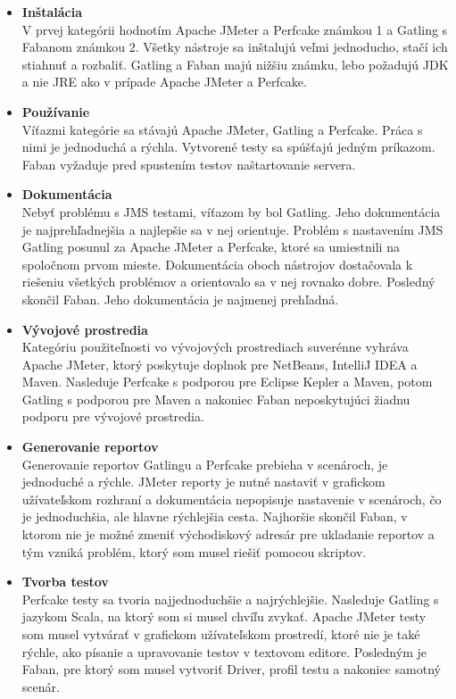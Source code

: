 \documentclass[12pt,oneside,final]{fithesis-utf8}
\begin{document}
\begin{itemize}

\item \textbf{Inštalácia}\\
V prvej kategórii hodnotím Apache JMeter a Perfcake známkou 1 a Gatling s Fabanom známkou 2. Všetky nástroje sa inštalujú veľmi jednoducho, stačí ich stiahnuť a rozbaliť. Gatling a Faban majú nižšiu známku, lebo požadujú JDK a nie JRE ako v prípade Apache JMeter a Perfcake.

\item \textbf{Používanie}\\
Víťazmi kategórie sa stávajú Apache JMeter, Gatling a Perfcake. Práca s nimi je jednoduchá a rýchla. Vytvorené testy sa spúšťajú jedným príkazom. Faban vyžaduje pred spustením testov naštartovanie servera.

\item \textbf{Dokumentácia}\\
Nebyť problému s JMS testami, víťazom by bol Gatling. Jeho dokumentácia je najprehľadnejšia a najlepšie sa v nej orientuje. Problém s nastavením JMS Gatling posunul za Apache JMeter a Perfcake, ktoré sa umiestnili na spoločnom prvom mieste. Dokumentácia oboch nástrojov dostačovala k riešeniu všetkých problémov a orientovalo sa v nej rovnako dobre. Posledný skončil Faban. Jeho dokumentácia je najmenej prehľadná. 

\item \textbf{Vývojové prostredia}\\
Kategóriu použiteľnosti vo vývojových prostrediach suverénne vyhráva Apache JMeter, ktorý poskytuje doplnok pre NetBeans, IntelliJ IDEA a Maven. Nasleduje Perfcake s podporou pre Eclipse Kepler a Maven, potom Gatling s podporou pre Maven a nakoniec Faban neposkytujúci žiadnu podporu pre vývojové prostredia.

\item \textbf{Generovanie reportov}\\
Generovanie reportov Gatlingu a Perfcake prebieha v scenároch, je jednoduché a rýchle. JMeter reporty je nutné nastaviť v grafickom užívateľskom rozhraní a dokumentácia nepopisuje nastavenie v scenároch, čo je jednoduchšia, ale hlavne rýchlejšia cesta. Najhoršie skončil Faban, v ktorom nie je možné zmeniť východiskový adresár pre ukladanie reportov a tým vzniká problém, ktorý som musel riešiť pomocou skriptov.

\item \textbf{Tvorba testov}\\
Perfcake testy sa tvoria najjednoduchšie a najrýchlejšie. Nasleduje Gatling s jazykom Scala, na ktorý som si musel chvíľu zvykať. Apache JMeter testy som musel vytvárať v grafickom užívateľskom prostredí, ktoré nie je také rýchle, ako písanie a upravovanie testov v textovom editore. Posledným je Faban, pre ktorý som musel vytvoriť Driver, profil testu a nakoniec samotný scenár.


\end{itemize}
\end{document}
